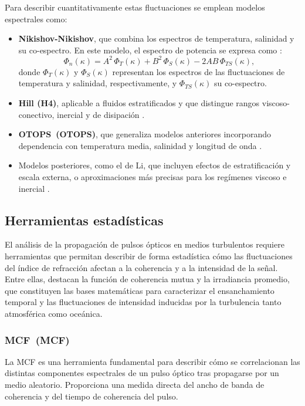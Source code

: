 Para describir cuantitativamente estas fluctuaciones se emplean modelos espectrales como:

\begin{itemize}
    \item \textbf{Nikishov-Nikishov}, que combina los espectros de temperatura, salinidad y su co-espectro. En este modelo, el espectro de potencia se expresa como \cite{Nikishov}:
    \begin{equation}
\Phi_n(\kappa) = A^2 \, \Phi_T(\kappa) 
+ B^2 \, \Phi_S(\kappa)
- 2AB \, \Phi_{TS}(\kappa),
\end{equation}
donde $\Phi_T(\kappa)$ y $\Phi_S(\kappa)$ representan los espectros de las fluctuaciones de temperatura y salinidad, respectivamente, y $\Phi_{TS}(\kappa)$ su co-espectro.
    \item \textbf{Hill (H4)}, aplicable a fluidos estratificados y que distingue rangos viscoso-conectivo, inercial y de disipación \cite{Hill}.
    \item \textbf{\acs{OTOPS}~(\acl{OTOPS})}, que generaliza modelos anteriores incorporando dependencia con temperatura media, salinidad y longitud de onda \cite{Korotkova}.
    \item Modelos posteriores, como el de Li, que incluyen efectos de estratificación y escala externa, o aproximaciones más precisas para los regímenes viscoso e inercial \cite{Li,Yi}.
\end{itemize}

\subsection{Herramientas estadísticas}
El análisis de la propagación de pulsos ópticos en medios turbulentos requiere herramientas que permitan describir de forma estadística cómo las fluctuaciones del índice de refracción afectan a la coherencia y a la intensidad de la señal. Entre ellas, destacan la función de coherencia mutua y la irradiancia promedio, que constituyen las bases matemáticas para caracterizar el ensanchamiento temporal y las fluctuaciones de intensidad inducidas por la turbulencia tanto atmosférica como oceánica.

\subsubsection{\acs{MCF}~(\acl{MCF})}
La MCF es una herramienta fundamental para describir cómo se correlacionan las distintas componentes espectrales de un pulso óptico tras propagarse por un medio aleatorio. Proporciona una medida directa del ancho de banda de coherencia y del tiempo de coherencia del pulso.

